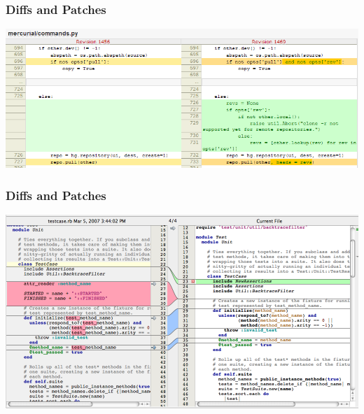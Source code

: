 \documentclass{beamer}
\begin{document}
\begin{frame}
\frametitle{Diffs and Patches}
  \includegraphics[width=1\textwidth]{imgs/02.png}
\end{frame}

\begin{frame}
\frametitle{Diffs and Patches}
  \includegraphics[width=1\textwidth]{imgs/03.png}
\end{frame}
\end{document}
